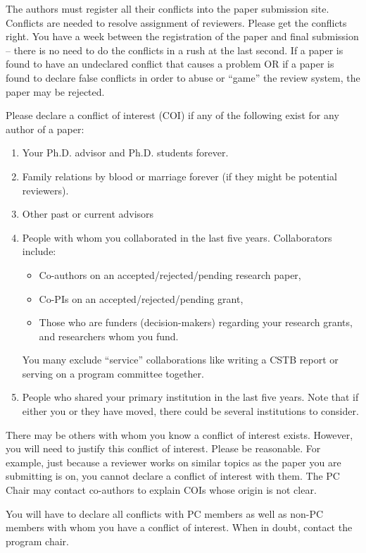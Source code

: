 \documentclass[pageno]{jpaper}
\begin{document}
The authors must register all their conflicts into the paper submission site.
Conflicts are needed to resolve assignment of reviewers. 
Please get the conflicts
right.  You have a week between the registration of the paper and final
submission -- there is no need to do the conflicts in a rush at the last
second. If a paper is found to
have an undeclared conflict that causes a problem OR if a paper is found to declare false conflicts in order to abuse or ``game'' the review system, the paper may be rejected.

Please declare a conflict of interest (COI) if any of the following exist for any author of a paper:

\begin{enumerate}
\item Your Ph.D. advisor and Ph.D. students forever.
\item Family relations by blood or marriage forever (if they might be potential reviewers).
\item Other past or current advisors
\item People with whom you collaborated in the last five years. Collaborators include:
\begin{itemize}
\item Co-authors on an accepted/rejected/pending research paper, 
\item Co-PIs on an accepted/rejected/pending grant, 
\item Those who are funders (decision-makers) regarding your research grants, and researchers whom you fund. 
\end{itemize}
You many exclude ``service'' collaborations like writing a CSTB report or serving on a program committee together.
\item People who shared your primary institution in the last five years. Note that if either you or they have moved, there could be several institutions to consider.
\end{enumerate}


There may be others with whom you know a conflict of interest exists.  However,
you will need to justify this conflict of interest.  Please be reasonable.  For
example, just because a reviewer works on similar topics as the paper you are
submitting is on, you cannot declare a conflict of interest with them. The PC Chair may contact co-authors to explain COIs whose origin is not clear.

You will have to declare all conflicts with PC members as well as non-PC members 
with whom you
have a conflict of interest.  When in doubt, contact the program chair.
\end{document}
